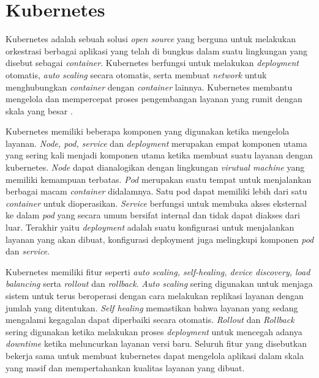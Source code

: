\section{Kubernetes}

Kubernetes adalah sebuah solusi \textit{open source} yang berguna untuk melakukan orkestrasi berbagai aplikasi yang telah di bungkus dalam suatu lingkungan yang disebut sebagai \textit{container}. Kubernetes berfungsi untuk melakukan \textit{deployment} otomatis, \textit{auto scaling} secara otomatis, serta membuat \textit{network} untuk menghubungkan \textit{container} dengan \textit{container} lainnya. Kubernetes membantu mengelola dan mempercepat proses pengembangan layanan yang rumit dengan skala yang besar \parencite{helmkubernetes}.

Kubernetes memiliki beberapa komponen yang digunakan ketika mengelola layanan. \textit{Node, pod, service} dan \textit{deployment} merupakan empat komponen utama yang sering kali menjadi komponen utama ketika membuat suatu layanan dengan kubernetes. \textit{Node} dapat dianalogikan dengan lingkungan \textit{virutual machine} yang memiliki kemampuan terbatas. \textit{Pod} merupakan suatu tempat untuk menjalankan berbagai macam \textit{container} didalamnya. Satu pod dapat memiliki lebih dari satu \textit{container} untuk dioperasikan. \textit{Service} berfungsi untuk membuka akses eksternal ke dalam \textit{pod} yang secara umum bersifat internal dan tidak dapat diakses dari luar. Terakhir yaitu \textit{deployment} adalah suatu konfigurasi untuk menjalankan layanan yang akan dibuat, konfigurasi deployment juga melingkupi komponen \textit{pod} dan \textit{service}.

Kubernetes memiliki fitur seperti \textit{auto scaling, self-healing, device discovery, load balancing} serta \textit{rollout} dan \textit{rollback}. \textit{Auto scaling} sering digunakan untuk menjaga sistem untuk terus beroperasi dengan cara melakukan replikasi layanan dengan jumlah yang ditentukan. \textit{Self healing} memastikan bahwa layanan yang sedang mengalami kegagalan dapat diperbaiki secara otomatis. \textit{Rollout} dan \textit{Rollback} sering digunakan ketika melakukan proses \textit{deployment} untuk mencegah adanya \textit{downtime} ketika meluncurkan layanan versi baru. Seluruh fitur yang disebutkan bekerja sama untuk membuat kubernetes dapat mengelola aplikasi dalam skala yang masif dan mempertahankan kualitas layanan yang dibuat.





